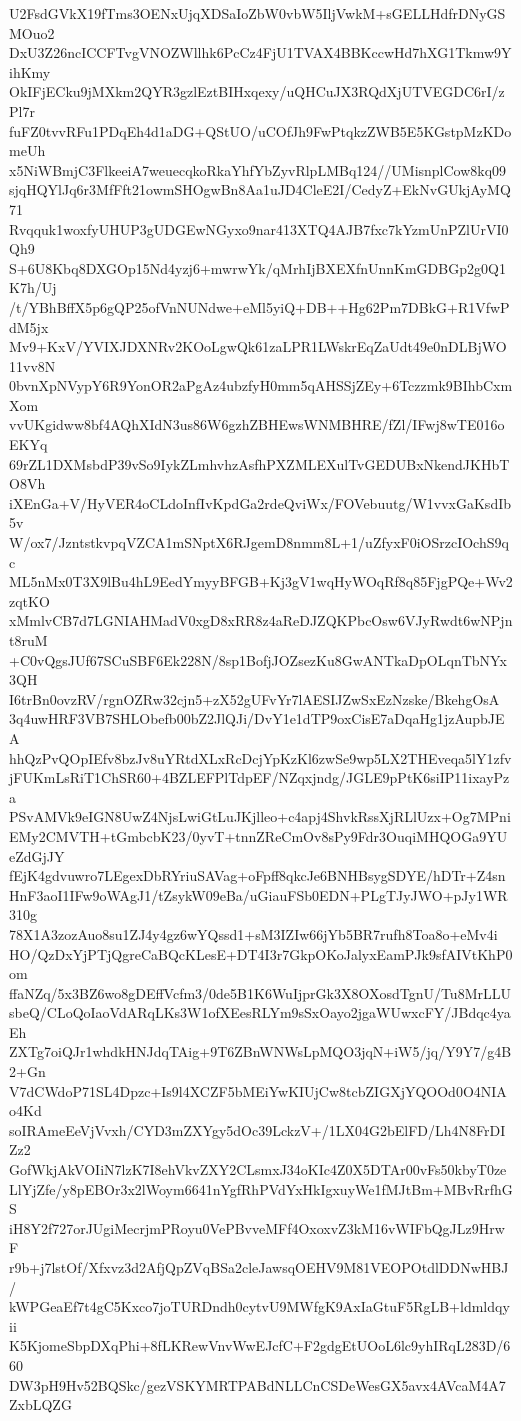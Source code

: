 U2FsdGVkX19fTms3OENxUjqXDSaIoZbW0vbW5IljVwkM+sGELLHdfrDNyGSMOuo2
DxU3Z26ncICCFTvgVNOZWllhk6PcCz4FjU1TVAX4BBKccwHd7hXG1Tkmw9YihKmy
OkIFjECku9jMXkm2QYR3gzlEztBIHxqexy/uQHCuJX3RQdXjUTVEGDC6rI/zPl7r
fuFZ0tvvRFu1PDqEh4d1aDG+QStUO/uCOfJh9FwPtqkzZWB5E5KGstpMzKDomeUh
x5NiWBmjC3FlkeeiA7weuecqkoRkaYhfYbZyvRlpLMBq124//UMisnplCow8kq09
sjqHQYlJq6r3MfFft21owmSHOgwBn8Aa1uJD4CleE2I/CedyZ+EkNvGUkjAyMQ71
Rvqquk1woxfyUHUP3gUDGEwNGyxo9nar413XTQ4AJB7fxc7kYzmUnPZlUrVI0Qh9
S+6U8Kbq8DXGOp15Nd4yzj6+mwrwYk/qMrhIjBXEXfnUnnKmGDBGp2g0Q1K7h/Uj
/t/YBhBffX5p6gQP25ofVnNUNdwe+eMl5yiQ+DB++Hg62Pm7DBkG+R1VfwPdM5jx
Mv9+KxV/YVIXJDXNRv2KOoLgwQk61zaLPR1LWskrEqZaUdt49e0nDLBjWO11vv8N
0bvnXpNVypY6R9YonOR2aPgAz4ubzfyH0mm5qAHSSjZEy+6Tczzmk9BIhbCxmXom
vvUKgidww8bf4AQhXIdN3us86W6gzhZBHEwsWNMBHRE/fZl/IFwj8wTE016oEKYq
69rZL1DXMsbdP39vSo9IykZLmhvhzAsfhPXZMLEXulTvGEDUBxNkendJKHbTO8Vh
iXEnGa+V/HyVER4oCLdoInfIvKpdGa2rdeQviWx/FOVebuutg/W1vvxGaKsdIb5v
W/ox7/JzntstkvpqVZCA1mSNptX6RJgemD8nmm8L+1/uZfyxF0iOSrzcIOchS9qc
ML5nMx0T3X9lBu4hL9EedYmyyBFGB+Kj3gV1wqHyWOqRf8q85FjgPQe+Wv2zqtKO
xMmlvCB7d7LGNIAHMadV0xgD8xRR8z4aReDJZQKPbcOsw6VJyRwdt6wNPjnt8ruM
+C0vQgsJUf67SCuSBF6Ek228N/8sp1BofjJOZsezKu8GwANTkaDpOLqnTbNYx3QH
I6trBn0ovzRV/rgnOZRw32cjn5+zX52gUFvYr7lAESIJZwSxEzNzske/BkehgOsA
3q4uwHRF3VB7SHLObefb00bZ2JlQJi/DvY1e1dTP9oxCisE7aDqaHg1jzAupbJEA
hhQzPvQOpIEfv8bzJv8uYRtdXLxRcDcjYpKzKl6zwSe9wp5LX2THEveqa5lY1zfv
jFUKmLsRiT1ChSR60+4BZLEFPlTdpEF/NZqxjndg/JGLE9pPtK6siIP11ixayPza
PSvAMVk9eIGN8UwZ4NjsLwiGtLuJKjlleo+c4apj4ShvkRssXjRLlUzx+Og7MPni
EMy2CMVTH+tGmbcbK23/0yvT+tnnZReCmOv8sPy9Fdr3OuqiMHQOGa9YUeZdGjJY
fEjK4gdvuwro7LEgexDbRYriuSAVag+oFpff8qkcJe6BNHBsygSDYE/hDTr+Z4sn
HnF3aoI1IFw9oWAgJ1/tZsykW09eBa/uGiauFSb0EDN+PLgTJyJWO+pJy1WR310g
78X1A3zozAuo8su1ZJ4y4gz6wYQssd1+sM3IZIw66jYb5BR7rufh8Toa8o+eMv4i
HO/QzDxYjPTjQgreCaBQcKLesE+DT4I3r7GkpOKoJalyxEamPJk9sfAIVtKhP0om
ffaNZq/5x3BZ6wo8gDEffVcfm3/0de5B1K6WuIjprGk3X8OXosdTgnU/Tu8MrLLU
sbeQ/CLoQoIaoVdARqLKs3W1ofXEesRLYm9sSxOayo2jgaWUwxcFY/JBdqc4yaEh
ZXTg7oiQJr1whdkHNJdqTAig+9T6ZBnWNWsLpMQO3jqN+iW5/jq/Y9Y7/g4B2+Gn
V7dCWdoP71SL4Dpzc+Is9l4XCZF5bMEiYwKIUjCw8tcbZIGXjYQOOd0O4NIAo4Kd
soIRAmeEeVjVvxh/CYD3mZXYgy5dOc39LckzV+/1LX04G2bElFD/Lh4N8FrDIZz2
GofWkjAkVOIiN7lzK7I8ehVkvZXY2CLsmxJ34oKIc4Z0X5DTAr00vFs50kbyT0ze
LlYjZfe/y8pEBOr3x2lWoym6641nYgfRhPVdYxHkIgxuyWe1fMJtBm+MBvRrfhGS
iH8Y2f727orJUgiMecrjmPRoyu0VePBvveMFf4OxoxvZ3kM16vWIFbQgJLz9HrwF
r9b+j7lstOf/Xfxvz3d2AfjQpZVqBSa2cleJawsqOEHV9M81VEOPOtdlDDNwHBJ/
kWPGeaEf7t4gC5Kxco7joTURDndh0cytvU9MWfgK9AxIaGtuF5RgLB+ldmldqyii
K5KjomeSbpDXqPhi+8fLKRewVnvWwEJcfC+F2gdgEtUOoL6lc9yhIRqL283D/660
DW3pH9Hv52BQSkc/gezVSKYMRTPABdNLLCnCSDeWesGX5avx4AVcaM4A7ZxbLQZG
